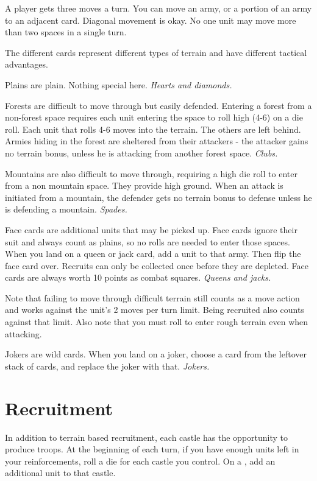 \documentclass{article}
\begin{document}
A player gets three moves a turn.  You can move an army, or a portion of an army to an adjacent card.  Diagonal movement is okay.  No one unit may move more than two spaces in a single turn.

The different cards represent different types of terrain and have different tactical advantages.

Plains are plain.  Nothing special here.  \emph{Hearts and diamonds.}

Forests are difficult to move through but easily defended.  Entering a forest from a non-forest space requires each unit entering the space to roll high (4-6) on a die roll.  Each unit that rolls 4-6 moves into the terrain.  The others are left behind.  Armies hiding in the forest are sheltered from their attackers - the attacker gains no terrain bonus, unless he is attacking from another forest space. \emph{Clubs.}

Mountains are also difficult to move through, requiring a high die roll to enter from a non mountain space.  They provide high ground.  When an attack is initiated from a mountain, the defender gets no terrain bonus to defense unless he is defending a mountain.  \emph{Spades.}

Face cards are additional units that may be picked up.  Face cards ignore their suit and always count as plains, so no rolls are needed to enter those spaces.  When you land on a queen or jack card, add a unit to that army.  Then flip the face card over.  Recruits can only be collected once before they are depleted.  Face cards are always worth 10 points as combat squares.  \emph{Queens and jacks.}

Note that failing to move through difficult terrain still counts as a move action and works against the unit's 2 moves per turn limit.  Being recruited also counts against that limit.  Also note that you must roll to enter rough terrain even when attacking.

Jokers are wild cards.  When you land on a joker, choose a card from the leftover stack of cards, and replace the joker with that.  \emph{Jokers.}


\section{Recruitment}

In addition to terrain based recruitment, each castle has the opportunity to produce troops.  At the beginning of each turn, if you have enough units left in your reinforcements, roll a die for each castle you control.  On a \recruitroll, add an additional unit to that castle.
\end{document}
